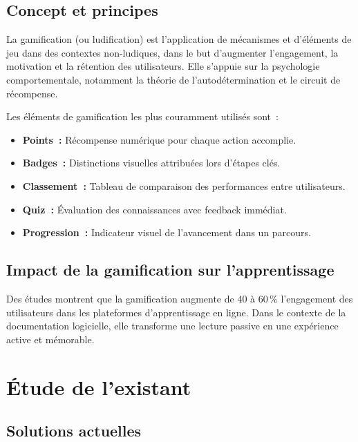 \documentclass[12pt, a4paper, twoside, openany]{report}
\begin{document}
\subsection{Concept et principes}

\begin{definition}[Gamification]
La gamification (ou ludification) est l'application de m\'ecanismes et d'\'el\'ements
de jeu dans des contextes non-ludiques, dans le but d'augmenter l'engagement, la
motivation et la r\'etention des utilisateurs. Elle s'appuie sur la psychologie
comportementale, notamment la th\'eorie de l'autod\'etermination et le circuit de
r\'ecompense.
\end{definition}

Les \'el\'ements de gamification les plus couramment utilis\'es sont~:
\begin{itemize}
  \item \textbf{Points~:} R\'ecompense num\'erique pour chaque action accomplie.
  \item \textbf{Badges~:} Distinctions visuelles attribu\'ees lors d'\'etapes cl\'es.
  \item \textbf{Classement~:} Tableau de comparaison des performances entre utilisateurs.
  \item \textbf{Quiz~:} \'Evaluation des connaissances avec feedback imm\'ediat.
  \item \textbf{Progression~:} Indicateur visuel de l'avancement dans un parcours.
\end{itemize}

\subsection{Impact de la gamification sur l'apprentissage}

Des \'etudes montrent que la gamification augmente de 40 \`a 60\,\% l'engagement des
utilisateurs dans les plateformes d'apprentissage en ligne. Dans le contexte de la
documentation logicielle, elle transforme une lecture passive en une exp\'erience
active et m\'emorable.

\section{\'Etude de l'existant}

\subsection{Solutions actuelles}
\end{document}
